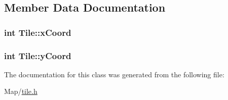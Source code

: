 \subsection{Member Data Documentation}
\subsubsection[{\texorpdfstring{x\+Coord}{xCoord}}]{\setlength{\rightskip}{0pt plus 5cm}int Tile\+::x\+Coord\hspace{0.3cm}{\ttfamily [protected]}}\hypertarget{classTile_ac23f889a0d8504d51fd58cffeb439aea}{}\label{classTile_ac23f889a0d8504d51fd58cffeb439aea}
\subsubsection[{\texorpdfstring{y\+Coord}{yCoord}}]{\setlength{\rightskip}{0pt plus 5cm}int Tile\+::y\+Coord\hspace{0.3cm}{\ttfamily [protected]}}\hypertarget{classTile_a58b75b0c64f89837a634611870e48ca4}{}\label{classTile_a58b75b0c64f89837a634611870e48ca4}


The documentation for this class was generated from the following file\+:\begin{DoxyCompactItemize}
\item 
Map/\hyperlink{tile_8h}{tile.\+h}\end{DoxyCompactItemize}
